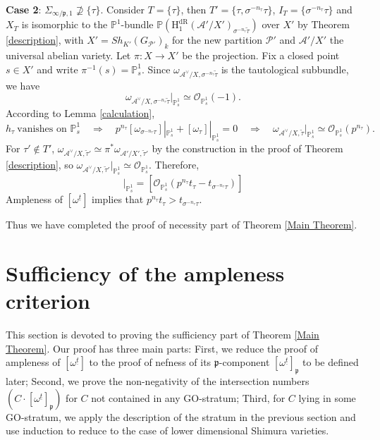 \documentclass{article}
\begin{document}
\textbf{Case 2}: $\Sigma_{\infty/\mathfrak{p},1}\nsupseteq\{\tau\}$. Consider $T=\{\tau\}$, then $T'=\{\tau,\sigma^{-n_\tau}\tau\}$, $I_T=\{\sigma^{-n_\tau}\tau\}$ and $X_T$ is isomorphic to the $\mathbb{P}^1$-bundle $\mathbb{P}(\text{H}_1^{\text{dR}}(\mathcal{A}'/X')_{\sigma^{-n_\tau}\tilde\tau})$ over $X'$ by Theorem \ref{description}, with $X'=Sh_{K'}(G_{\mathcal{P}'})_k$ for the new partition $\mathcal{P}'$ and $\mathcal{A}'/X'$ the universal abelian variety. Let $\pi:X\to X'$ be the projection. Fix a closed point $s\in X'$ and write $\pi^{-1}(s)=\mathbb{P}^1_s$. Since $\omega_{\mathcal{A}^\vee/X,\sigma^{-n_\tau}\tilde\tau}$ is the tautological subbundle, we have
\begin{equation}
\omega_{\mathcal{A}^\vee/X,\sigma^{-n_\tau}\tilde\tau}|_{\mathbb{P}^1_s}\simeq\mathcal{O}_{\mathbb{P}_s^1}(-1).
\end{equation}
According to Lemma \ref{calculation},
\begin{equation}
h_\tau\ \text{vanishes on }\mathbb{P}^1_s\quad \Rightarrow \quad p^{n_\tau}[\omega_{\sigma^{-n_\tau}\tau}]|_{\mathbb{P}^1_s}+[\omega_{\tau}]|_{\mathbb{P}^1_s}=0\quad \Rightarrow\quad \omega_{\mathcal{A}^\vee/X,\tilde\tau}|_{\mathbb{P}_s^1}\simeq \mathcal{O}_{\mathbb{P}_s^1}(p^{n_\tau}) .
\end{equation}
For $\tau'\notin T'$, $\omega_{\mathcal{A}^\vee/X,\tilde\tau'}\simeq \pi^\ast\omega_{\mathcal{A}'/X',\tilde\tau'}$ by the construction in the proof of Theorem \ref{description}, so $\omega_{\mathcal{A}^\vee/X,\tilde\tau'}|_{\mathbb{P}_s^1}\simeq\mathcal{O}_{\mathbb{P}_s^1}$. Therefore,
\begin{equation}
[\omega^{\underline{t}}]|_{\mathbb{P}_s^1}=[\mathcal{O}_{\mathbb{P}_s^1}(p^{n_\tau}t_\tau-t_{\sigma^{-n_\tau}\tau})]
\end{equation}
Ampleness of $[\omega^{\underline{t}}]$ implies that $p^{n_\tau}t_\tau>t_{\sigma^{-n_\tau}\tau}$.

Thus we have completed the proof of necessity part of Theorem \ref{Main Theorem}.







\section{Sufficiency of the ampleness criterion}\label{Sufficiency}

This section is devoted to proving the sufficiency part of Theorem \ref{Main Theorem}. Our proof has three main parts: First, we reduce the proof of ampleness of $[\omega^{\underline{t}}]$ to the proof of nefness of its $\mathfrak{p}$-component $[\omega^{\underline{t}}]_\mathfrak{p}$ to be defined later; Second, we prove the non-negativity of the intersection numbers $(C\cdot [\omega^{\underline{t}}]_{\mathfrak{p}})$ for $C$ not contained in any GO-stratum; Third, for $C$ lying in some GO-stratum, we apply the description of the stratum in the previous section and use induction to reduce to the case of lower dimensional Shimura varieties.
\end{document}
